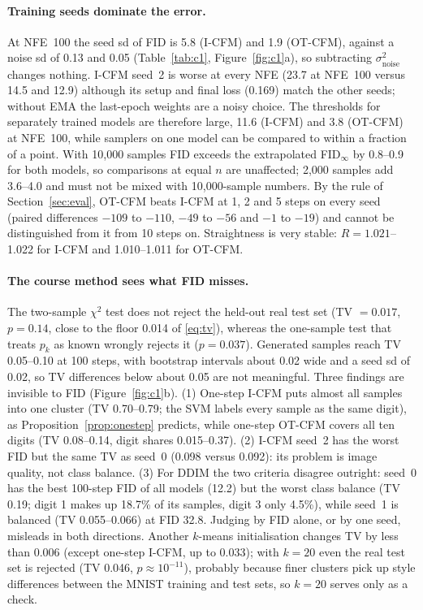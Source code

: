 \paragraph{Training seeds dominate the error.} At NFE~100 the seed sd of FID is 5.8 (I-CFM) and 1.9 (OT-CFM), against a noise sd of 0.13 and 0.05 (Table~\ref{tab:c1}, Figure~\ref{fig:c1}a), so subtracting $\sigma^2_{\text{noise}}$ changes nothing. I-CFM seed~2 is worse at every NFE (23.7 at NFE~100 versus 14.5 and 12.9) although its setup and final loss (0.169) match the other seeds; without EMA the last-epoch weights are a noisy choice. The thresholds for separately trained models are therefore large, 11.6 (I-CFM) and 3.8 (OT-CFM) at NFE~100, while samplers on one model can be compared to within a fraction of a point. With 10,000 samples FID exceeds the extrapolated FID$_\infty$ by 0.8--0.9 for both models, so comparisons at equal $n$ are unaffected; 2,000 samples add 3.6--4.0 and must not be mixed with 10,000-sample numbers. By the rule of Section~\ref{sec:eval}, OT-CFM beats I-CFM at 1, 2 and 5 steps on every seed (paired differences $-109$ to $-110$, $-49$ to $-56$ and $-1$ to $-19$) and cannot be distinguished from it from 10 steps on. Straightness is very stable: $R=1.021$--1.022 for I-CFM and 1.010--1.011 for OT-CFM. %
\paragraph{The course method sees what FID misses.} The two-sample $\chi^2$ test does not reject the held-out real test set (TV $=0.017$, $p=0.14$, close to the floor 0.014 of \eqref{eq:tv}), whereas the one-sample test that treats $p_k$ as known wrongly rejects it ($p=0.037$). Generated samples reach TV 0.05--0.10 at 100 steps, with bootstrap intervals about 0.02 wide and a seed sd of 0.02, so TV differences below about 0.05 are not meaningful. Three findings are invisible to FID (Figure~\ref{fig:c1}b). (1) One-step I-CFM puts almost all samples into one cluster (TV 0.70--0.79; the SVM labels every sample as the same digit), as Proposition~\ref{prop:onestep} predicts, while one-step OT-CFM covers all ten digits (TV 0.08--0.14, digit shares 0.015--0.37). (2) I-CFM seed~2 has the worst FID but the same TV as seed~0 (0.098 versus 0.092): its problem is image quality, not class balance. (3) For DDIM the two criteria disagree outright: seed~0 has the best 100-step FID of all models (12.2) but the worst class balance (TV 0.19; digit 1 makes up 18.7\% of its samples, digit 3 only 4.5\%), while seed~1 is balanced (TV 0.055--0.066) at FID 32.8. Judging by FID alone, or by one seed, misleads in both directions. Another $k$-means initialisation changes TV by less than 0.006 (except one-step I-CFM, up to 0.033); with $k=20$ even the real test set is rejected (TV 0.046, $p\approx10^{-11}$), probably because finer clusters pick up style differences between the MNIST training and test sets, so $k=20$ serves only as a check. %

